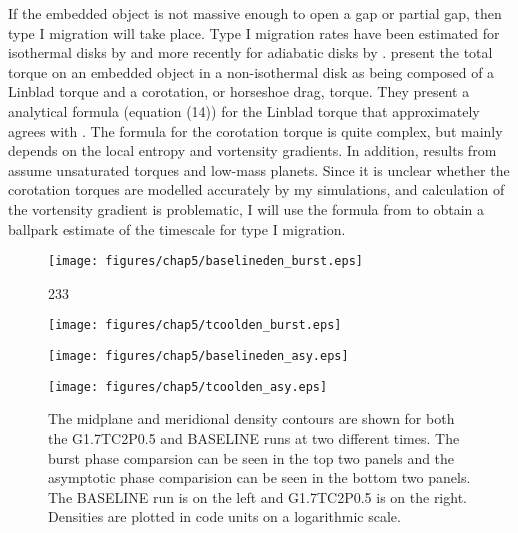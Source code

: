 If the embedded object is not massive enough to open a gap or partial gap, then type I migration will take place. Type I migration rates have been estimated for isothermal disks by \citet{tanaka2002} and more recently for adiabatic disks by \citet{paardekooper2010}. \citeauthor{paardekooper2010} present the total torque on an embedded object in a non-isothermal disk as being composed of a Linblad torque and a corotation, or horseshoe drag, torque. They present a analytical formula (equation (14)) for the Linblad torque that approximately agrees with \citet{tanaka2002}. The formula for the corotation torque is quite complex, but mainly depends on the local entropy and vortensity gradients. In addition, results from \citeauthor{paardekooper2010} assume unsaturated torques and low-mass planets. Since it is unclear whether the corotation torques are modelled accurately by my simulations, and calculation of the vortensity gradient is problematic, I will use the formula from \citet{tanaka2002} to obtain a ballpark estimate of the timescale for type I migration.

\begin{figure}[p]
\begin{minipage}{0.5\linewidth}
\centering
\texttt{[image: figures/chap5/baselineden\_burst.eps]}
\end{minipage}
\hspace{0.25in}
233\begin{minipage}{0.5\linewidth}
\centering
\texttt{[image: figures/chap5/tcoolden\_burst.eps]}
\end{minipage}
\vspace{0.5in}


\begin{minipage}{0.5\linewidth}
\centering
\texttt{[image: figures/chap5/baselineden\_asy.eps]}
\end{minipage}
\hspace{0.25in}
\begin{minipage}{0.5\linewidth}
\centering
\texttt{[image: figures/chap5/tcoolden\_asy.eps]}
\end{minipage}
\caption[Comparison of midplane and meridional densities for constant $t_{cool}$ and BASELINE runs]{The midplane and meridional density contours are shown for both the G1.7TC2P0.5 and BASELINE runs at two different times. The burst phase comparsion can be seen in the top two panels and the asymptotic phase comparision can be seen in the bottom two panels. The BASELINE run is on the left and G1.7TC2P0.5 is on the right. Densities are plotted in code units on a logarithmic scale.}
\label{fig:PL:tcoolcomp}
\end{figure}

